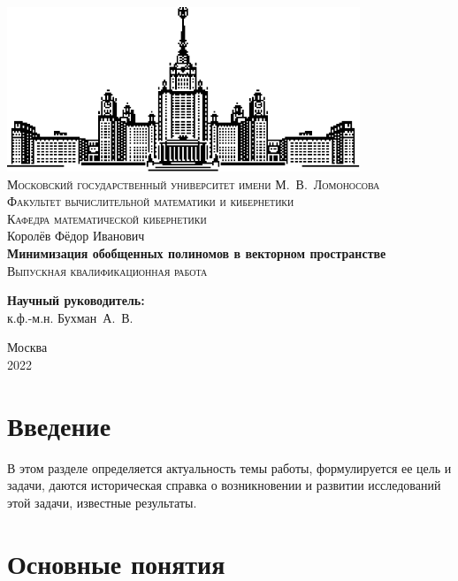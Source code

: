 \documentclass[a4paper,12pt,titlepage]{article}
\begin{document}
\hypersetup{pageanchor=false}
\begin{titlepage}
    \begin{center}
        \includegraphics{logo.pdf} \\
        \textsc{\small Московский государственный университет имени М.~В.~Ломоносова \\
        Факультет вычислительной математики и кибернетики \\
        Кафедра математической кибернетики \\}
        \vfill
        \large{Королёв Фёдор Иванович} \\
        \vspace{1cm}
        \textbf{\large Минимизация обобщенных полиномов в векторном пространстве} \\
        \vfill
        \textsc{\large Выпускная квалификационная работа} \\
    \end{center}
    \begin{flushright}
        \vfill
        \textbf{Научный руководитель:} \\
        к.ф.-м.н. Бухман~А.~В.
    \end{flushright}
    \begin{center}
        \vfill
        {\small Москва\\2022}
    \end{center}
\end{titlepage}

\hypersetup{pageanchor=true}
\tableofcontents
\newpage

\section{Введение}

В этом разделе определяется актуальность темы работы, формулируется ее цель и задачи, даются историческая справка о возникновении и развитии исследований этой задачи, известные результаты.

\section{Основные понятия}
\end{document}
